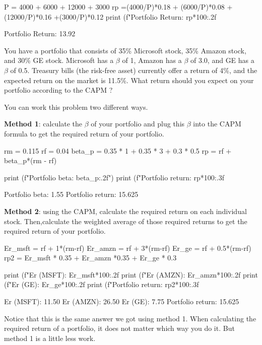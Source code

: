\cprotEnv \begin{solution}
\begin{ipython}
P = 4000 + 6000 + 12000 + 3000
rp =(4000/P)*0.18 + (6000/P)*0.08 + (12000/P)*0.16 +(3000/P)*0.12
print (f"Portfolio Return: {rp*100:.2f}%
\end{ipython}
\begin{ioutput}
Portfolio Return: 13.92%
\end{ioutput}
\end{solution}	

\begin{question}
You have a portfolio that consists of 35\% Microsoft stock, 35\% Amazon stock, and 30\% GE stock. Microsoft has a $\beta$ of 1, Amazon has a $\beta$ of 3.0, and GE has a $\beta$ of 0.5. Treasury bills (the risk-free asset) currently offer a return of 4\%, and the expected return on the market is 11.5\%. What return should you expect on your portfolio according to the CAPM ? 
\end{question}

\cprotEnv \begin{solution}
You can work this problem two different ways.

\textbf{Method 1}: calculate the $\beta$ of your portfolio and plug this $\beta$ into the CAPM formula to get the required return of your portfolio.

\begin{ipython}
rm = 0.115
rf = 0.04
beta_p = 0.35 * 1 + 0.35 * 3 + 0.3 * 0.5
rp = rf + beta_p*(rm - rf)

print (f"Portfolio beta: {beta_p:.2f}")
print (f"Portfolio return: {rp*100:.3f}%
\end{ipython}
\begin{ioutput}
Portfolio beta: 1.55
Portfolio return: 15.625%
\end{ioutput}

\textbf{Method 2}: using the CAPM, calculate the required return on each individual stock. Then,calculate the weighted average of those required returns to get the required return of your portfolio.

\begin{ipython}
Er_msft = rf + 1*(rm-rf)
Er_amzn = rf + 3*(rm-rf)
Er_ge = rf + 0.5*(rm-rf)
rp2 = Er_msft * 0.35 + Er_amzn *0.35 + Er_ge * 0.3

print (f"Er (MSFT): {Er_msft*100:.2f}%
print (f"Er (AMZN): {Er_amzn*100:.2f}%
print (f"Er (GE): {Er_ge*100:.2f}%
print (f"Portfolio return: {rp2*100:.3f}%
\end{ipython}
\begin{ioutput}
Er (MSFT): 11.50%
Er (AMZN): 26.50%
Er (GE): 7.75%
Portfolio return: 15.625%
\end{ioutput}
Notice that this is the same answer we got using method 1. When calculating the required return of a portfolio, it does not matter which way you do it. But method 1 is a little less work.
\end{solution}
